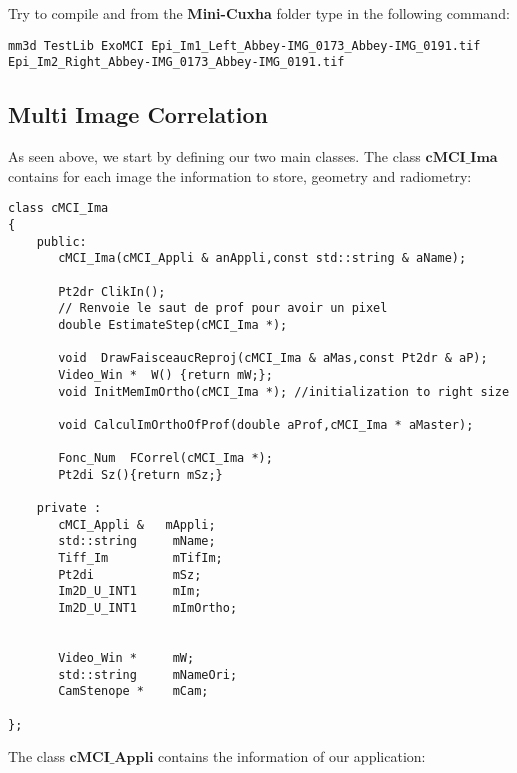 \documentclass[a4paper]{book}
\begin{document}
Try to compile and from the \textbf{Mini-Cuxha} folder type in the following command:
\begin{lstlisting}
mm3d TestLib ExoMCI Epi_Im1_Left_Abbey-IMG_0173_Abbey-IMG_0191.tif Epi_Im2_Right_Abbey-IMG_0173_Abbey-IMG_0191.tif
\end{lstlisting}
\newpage
\subsection{Multi Image Correlation}
As seen above, we start by defining our two main classes. The class $\textbf{cMCI\_Ima}$ contains for each image the information to store, geometry and radiometry:

\begin{lstlisting}
class cMCI_Ima
{
    public:
       cMCI_Ima(cMCI_Appli & anAppli,const std::string & aName);

       Pt2dr ClikIn();
       // Renvoie le saut de prof pour avoir un pixel
       double EstimateStep(cMCI_Ima *);

       void  DrawFaisceaucReproj(cMCI_Ima & aMas,const Pt2dr & aP);
       Video_Win *  W() {return mW;};
       void InitMemImOrtho(cMCI_Ima *); //initialization to right size

       void CalculImOrthoOfProf(double aProf,cMCI_Ima * aMaster);

       Fonc_Num  FCorrel(cMCI_Ima *);
       Pt2di Sz(){return mSz;}

    private :
       cMCI_Appli &   mAppli;
       std::string     mName;
       Tiff_Im         mTifIm;
       Pt2di           mSz;
       Im2D_U_INT1     mIm;
       Im2D_U_INT1     mImOrtho;


       Video_Win *     mW;
       std::string     mNameOri;
       CamStenope *    mCam;

};
\end{lstlisting}

The class $\textbf{cMCI\_Appli}$ contains the information of our application:
\end{document}
